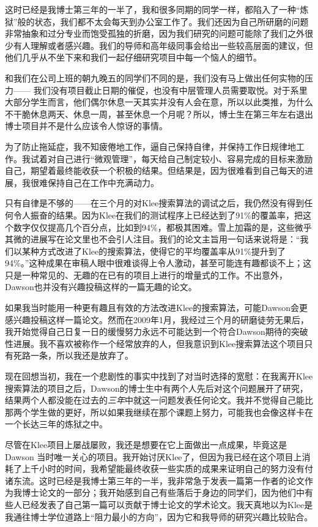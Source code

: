 \documentclass[12pt,UTF8,nofonts]{book}
\begin{document}
这时已经是我博士第三年的一半了，我和很多同期的同学一样，都陷入了一种“炼狱”般的状态，我们都不太会每天到办公室工作了。我们还因为自己所研磨的问题非常抽象和过分专业而饱受孤独的折磨，因为我们研究的问题可能除了我们之外很少有人理解或者感兴趣。我们的导师和高年级同事会给出一些较高层面的建议，但他们几乎从不坐下来和我们一起仔细研究项目中每一个恼人的细节。

和我们在公司上班的朝九晚五的同学们不同的是，我们没有马上做出任何实物的压力—— 我们没有项目截止日期的催促，也没有中层管理人员需要取悦。对于系里大部分学生而言，他们偶尔休息一天其实并没有人会在意，所以以此类推，为什么不干脆休息两天、休息一周，甚至休息一个月呢？所以，博士生在第三年左右退出博士项目并不是什么应该令人惊讶的事情。

为了防止拖延症，我不知疲倦地工作，逼自己保持自律，并保持工作日规律地工作。我试着对自己进行“微观管理”，每天给自己制定较小、容易完成的目标来激励自己，期望着最终能收获一个积极的结果。但结果是，因为很难看到自己每天的进展，我很难保持自己在工作中充满动力。

只有自律是不够的——在三个月的对Klee搜索算法的调试之后，我仍然没有得到任何令人振奋的结果。因为Klee在我们的测试程序上已经达到了91\%的覆盖率，把这个数字仅仅提高几个百分点，比如到94\%，都极其困难。雪上加霜的是，这些微乎其微的进展写在论文里也不会引人注目。我们的论文主旨用一句话来说将是：“我们以某种方式改进了Klee的搜索算法，使得它的平均覆盖率从91\%提升到了94\%。”这种成果在审稿人眼中很难谈得上令人激动，甚至可能连有趣都谈不上；这只是一种常见的、无趣的在已有的项目上进行的增量式的工作。不出意外，Dawson也并没有兴趣投稿这样的一篇无趣的论文。

如果我当时能用一种更有趣且有效的方法改进Klee的搜索算法，可能Dawson会更感兴趣投稿这样一篇论文。然而在2009年1月，我经过三个月的研磨徒劳无果后，我开始觉得自己日复一日的缓慢努力永远不可能达到一个符合Dawson期待的突破性进展。我不喜欢被称作一个经常放弃的人，但我意识到Klee搜索算法这个项目只有死路一条，所以我还是放弃了。

现在回想当初，我在一个悲剧性的事实中找到了对当时选择的宽慰：在我离开Klee 搜索算法的项目之后，Dawson的博士生中有两个人先后对这个问题展开了研究，结果两个人都没能在过去的\emph{三年}中就这一问题发表任何论文。我并不觉得自己能比那两个学生做的更好，所以如果我继续在那个课题上努力，可能我也会像这样卡在一个长达三年的炼狱之中。

\breakline

尽管在Klee项目上屡战屡败，我还是想要在它上面做出一点成果，毕竟这是Dawson 当时唯一关心的项目。我开始讨厌Klee了，但因为我已经在这个项目上消耗了上千小时的时间，我希望能最终收获一些实质的成果来证明自己的努力没有付诸东流。这时已经是我博士第三年的一半，我非常急于发表一篇第一作者的论文作为我博士论文的一部分；我开始感到自己有些落后于身边的同学们，因为他们中有些人已经发表了自己第一篇可以贡献于博士论文的学术论文。我天真地以为Klee是我通往博士学位道路上“阻力最小的方向”，因为它和我导师的研究兴趣比较贴合。
\end{document}
